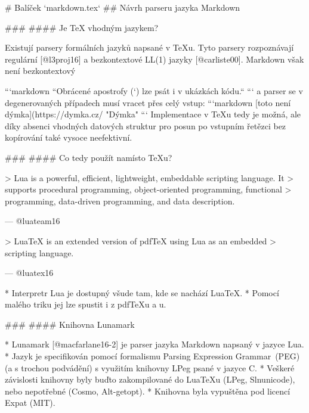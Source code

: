 \documentclass{beamer}
\begin{document}
# Balíček `markdown.tex`
## Návrh parseru jazyka Markdown

\begin{frame}

### \subsecname
#### Je \TeX{} vhodným jazykem?

Existují parsery formálních jazyků napsané v \TeX u. Tyto parsery
rozpoznávají regulární [@l3proj16] a bezkontextové LL(1) jazyky
[@carliste00].  Markdown však není bezkontextový

```markdown
``Obrácené apostrofy (`) lze psát i v ukázkách kódu.``
```
a parser se v degenerovaných případech musí vracet přes celý vstup:
```markdown
[toto není dýmka](https://dymka.cz/ "Dýmka"
```
Implementace v \TeX u tedy je možná, ale díky absenci vhodných datových
struktur pro posun po vstupním řetězci bez kopírování také vysoce
neefektivní.
\end{frame}
\begin{frame}

### \subsecname
#### Co tedy použít namísto \TeX u?

> Lua is a powerful, efficient, lightweight, embeddable scripting language. It
> supports procedural programming, object-oriented programming, functional
> programming, data-driven programming, and data description. 

\hfill --- @luateam16
\vfill

> Lua\TeX{} is an extended version of pdf\TeX{} using Lua as an embedded
> scripting language.

\hfill --- @luatex16
\vfill

 * Interpretr Lua je dostupný všude tam, kde se nachází Lua\TeX.
 * Pomocí malého triku jej lze spustit i z pdf\TeX u a u.

\end{frame}
\begin{frame}

### \subsecname
#### Knihovna Lunamark

  * Lunamark [@macfarlane16-2] je parser jazyka Markdown napsaný v jazyce Lua.
  * Jazyk je specifikován pomocí formalismu Parsing Expression
    Grammar~(PEG) (a s trochou podvádění) s využitím knihovny LPeg psané v
    jazyce C.
  * Veškeré závislosti knihovny byly buďto zakompilované do Lua\TeX u
    (LPeg, Slnunicode), nebo nepotřebné (Cosmo, Alt-getopt).
  * Knihovna byla vypuštěna pod licencí Expat (MIT).

\end{frame}
\end{document}
